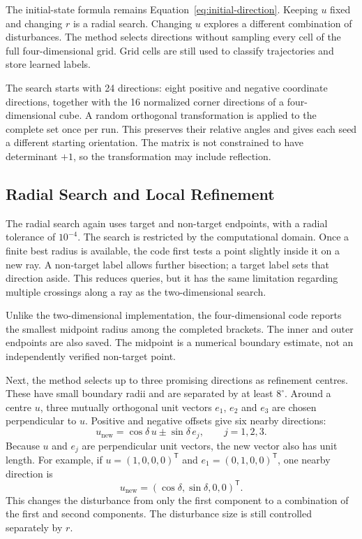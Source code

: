 The initial-state formula remains Equation~\eqref{eq:initial-direction}. Keeping $u$ fixed and changing $r$ is a radial search. Changing $u$ explores a different combination of disturbances. The method selects directions without sampling every cell of the full four-dimensional grid. Grid cells are still used to classify trajectories and store learned labels.

\begin{revision}
The search starts with 24 directions: eight positive and negative coordinate directions, together with the 16 normalized corner directions of a four-dimensional cube. A random orthogonal transformation is applied to the complete set once per run. This preserves their relative angles and gives each seed a different starting orientation. The matrix is not constrained to have determinant $+1$, so the transformation may include reflection.
\end{revision}

\subsection{Radial Search and Local Refinement}

The radial search again uses target and non-target endpoints, with a radial tolerance of $10^{-4}$. The search is restricted by the computational domain. Once a finite best radius is available, the code first tests a point slightly inside it on a new ray. A non-target label allows further bisection; a target label sets that direction aside. This reduces queries, but it has the same limitation regarding multiple crossings along a ray as the two-dimensional search.

Unlike the two-dimensional implementation, the four-dimensional code reports the smallest midpoint radius among the completed brackets. The inner and outer endpoints are also saved. The midpoint is a numerical boundary estimate, not an independently verified non-target point.

Next, the method selects up to three promising directions as refinement centres. These have small boundary radii and are separated by at least $8^\circ$. Around a centre $u$, three mutually orthogonal unit vectors $e_1$, $e_2$ and $e_3$ are chosen perpendicular to $u$. Positive and negative offsets give six nearby directions:
\begin{equation}
 u_{\mathrm{new}}=\cos\delta\,u\pm\sin\delta\,e_j,
 \qquad j=1,2,3.
\end{equation}
Because $u$ and $e_j$ are perpendicular unit vectors, the new vector also has unit length. For example, if $u=(1,0,0,0)^{\mathsf T}$ and $e_1=(0,1,0,0)^{\mathsf T}$, one nearby direction is
\begin{equation}
 u_{\mathrm{new}}=(\cos\delta,\sin\delta,0,0)^{\mathsf T}.
\end{equation}
This changes the disturbance from only the first component to a combination of the first and second components. The disturbance size is still controlled separately by $r$.

